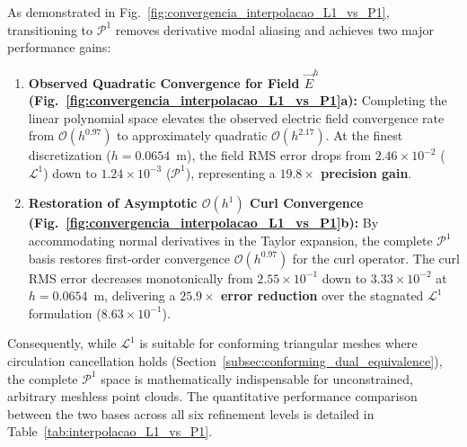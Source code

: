 \documentclass[preprint,12pt]{elsarticle}
\begin{document}
As demonstrated in Fig.~\ref{fig:convergencia_interpolacao_L1_vs_P1}, transitioning to $\mathcal{P}^1$ removes derivative modal aliasing and achieves two major performance gains:
\begin{enumerate}
    \item \textbf{Observed Quadratic Convergence for Field $\vec{E}^h$ (Fig.~\ref{fig:convergencia_interpolacao_L1_vs_P1}a):} Completing the linear polynomial space elevates the observed electric field convergence rate from $\mathcal{O}(h^{0.97})$ to approximately quadratic $\mathcal{O}(h^{2.17})$. At the finest discretization ($h = 0.0654$~m), the field RMS error drops from $2.46 \times 10^{-2}$ ($\mathcal{L}^1$) down to $1.24 \times 10^{-3}$ ($\mathcal{P}^1$), representing a \textbf{$19.8\times$ precision gain}.
    \item \textbf{Restoration of Asymptotic $\mathcal{O}(h^1)$ Curl Convergence (Fig.~\ref{fig:convergencia_interpolacao_L1_vs_P1}b):} By accommodating normal derivatives in the Taylor expansion, the complete $\mathcal{P}^1$ basis restores first-order convergence $\mathcal{O}(h^{0.97})$ for the curl operator. The curl RMS error decreases monotonically from $2.55 \times 10^{-1}$ down to $3.33 \times 10^{-2}$ at $h = 0.0654$~m, delivering a \textbf{$25.9\times$ error reduction} over the stagnated $\mathcal{L}^1$ formulation ($8.63 \times 10^{-1}$).
\end{enumerate}

Consequently, while $\mathcal{L}^1$ is suitable for conforming triangular meshes where circulation cancellation holds (Section~\ref{subsec:conforming_dual_equivalence}), the complete $\mathcal{P}^1$ space is mathematically indispensable for unconstrained, arbitrary meshless point clouds. The quantitative performance comparison between the two bases across all six refinement levels is detailed in Table~\ref{tab:interpolacao_L1_vs_P1}.
\end{document}
